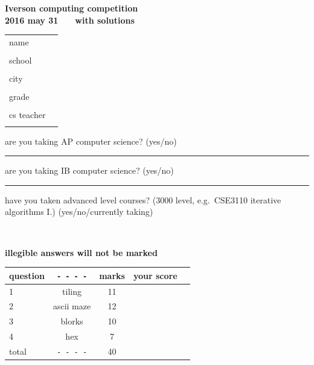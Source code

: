 \documentclass[12pt]{article}
\begin{document}
\thispagestyle{empty}

{\Large
\begin{center}
\textbf{Iverson computing competition} \\
\textbf{2016 may 31} ~ ~ \textbf{with solutions} \\
\end{center}
}

\vspace{0.5cm}

\noindent
{\large
\begin{tabular}{ll}
name &\underline{\hspace{8cm}} \\ \\
school &\underline{\hspace{8cm}} \\ \\
city &	\underline{\hspace{4cm}}  \\ \\
grade &	\underline{\hspace{2cm}}  \\ \\
cs teacher &	\underline{\hspace{8cm}}  \\ \\
\end{tabular}
}

\bigskip

{\large 
\noindent
are you taking AP computer science? (yes/no) \rule{1cm}{.5pt}

\noindent
are you taking IB computer science? (yes/no) \rule{1cm}{.5pt}

\medskip

\noindent have you taken advanced level courses? 
(3000 level, e.g.\ CSE3110 iterative algorithms I.)
(yes/no/currently taking) \rule[0mm]{0mm}{6mm} \ \ \hrulefill \ \ 
}

\vfill


\begin{center}
\bf \large
\noindent illegible answers will not be marked

\end{center}

\vfill
 
\begin{large}
\begin{center}
\begin{tabular}{|l|c|c|c|c|} \hline
question	& \verb+- - - -+& marks & your score     \\ \hline
1 \rule[-3mm]{0mm}{10mm}	& tiling &11& \\ \hline
2 \rule[-3mm]{0mm}{10mm}	& ascii maze &12& \\ \hline
3 \rule[-3mm]{0mm}{10mm}        & blorks &10&  \\ \hline
4 \rule[-3mm]{0mm}{10mm}	& hex & 7 & \\ \hline
total \rule[-3mm]{0mm}{10mm}	& \verb+- - - -+&40&\\ \hline
\end{tabular}
\end{center}
\end{large}
\end{document}
